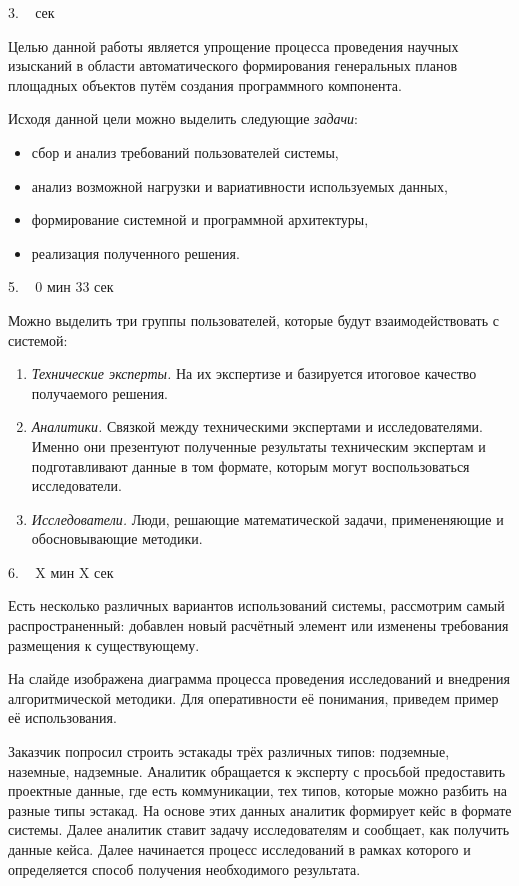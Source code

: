 \documentclass[a4paper,14pt]{extarticle}
\begin{document}
    3. ~  сек

    Целью данной работы является
    упрощение процесса проведения научных изысканий
    в области автоматического формирования генеральных планов площадных объектов
    путём создания программного компонента.

    Исходя данной цели можно выделить следующие \textit{задачи}:
    \begin{itemize}
        \item сбор и анализ требований пользователей системы,
        \item анализ возможной нагрузки и вариативности используемых данных,
        \item формирование системной и программной архитектуры,
        \item реализация полученного решения.
    \end{itemize}

    5. ~ 0 мин 33 сек

    Можно выделить три группы пользователей, которые будут взаимодействовать с системой:
    \begin{enumerate}
        \item {
            \textit{Технические эксперты.} На их экспертизе и базируется итоговое
            качество получаемого решения.
        }
        \item{
            \textit{Аналитики.} Связкой между техническими экспертами и исследователями.
            Именно они презентуют полученные результаты техническим экспертам и подготавливают данные в том формате,
            которым могут воспользоваться исследователи.
        }
        \item{
            \textit{Исследователи.} Люди, решающие математической задачи,
            примененяющие и обосновывающие методики.
        }
    \end{enumerate}

    6. ~ X мин X сек

    Есть несколько различных вариантов использований системы, рассмотрим самый распространенный:
    добавлен новый расчётный элемент или изменены требования размещения к существующему.

    На слайде изображена диаграмма процесса проведения исследований и
    внедрения алгоритмической методики. Для оперативности её понимания,
    приведем пример её использования.

    Заказчик попросил строить эстакады трёх различных типов: подземные, наземные, надземные.
    Аналитик обращается к эксперту с просьбой предоставить проектные данные, где есть коммуникации,
    тех типов, которые можно разбить на разные типы эстакад.
    На основе этих данных аналитик формирует кейс в формате системы.
    Далее аналитик ставит задачу исследователям и сообщает, как получить данные кейса.
    Далее начинается процесс исследований в рамках которого и определяется способ получения необходимого результата.
\end{document}
